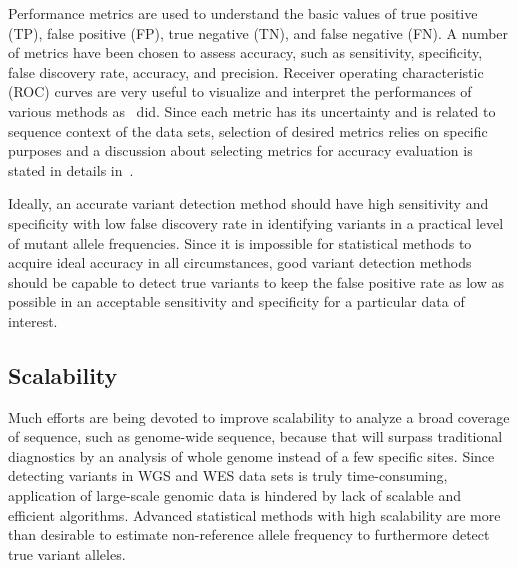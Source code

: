 \documentclass[a4,center,fleqn]{NAR}
\begin{document}
Performance metrics are used to understand the basic values of true positive (TP), false positive (FP), true negative (TN), and false negative (FN).
A number of metrics have been chosen to assess accuracy, such as sensitivity, specificity, false discovery rate, accuracy, and precision.
Receiver operating characteristic (ROC) curves are very useful to visualize and interpret the performances of various methods as~\citep{Xu2014, Huang2015, He2015} did.
Since each metric has its uncertainty and is related to sequence context of the data sets, selection of desired metrics relies on specific purposes and a discussion about selecting metrics for accuracy evaluation is stated in details in~\citep{Olson2015}.

Ideally, an accurate variant detection method should have high sensitivity and specificity with low false discovery rate in identifying variants in a practical level of mutant allele frequencies.
Since it is impossible for statistical methods to acquire ideal accuracy in all circumstances, good variant detection methods should be capable to detect true variants to keep the false positive rate as low as possible in an acceptable sensitivity and specificity for a particular data of interest.


\subsection{Scalability}

Much efforts are being devoted to improve scalability to analyze a broad coverage of sequence, such as genome-wide sequence, because that will surpass traditional diagnostics by an analysis of whole genome instead of a few specific sites.
Since detecting variants in WGS and WES data sets is truly time-consuming, application of large-scale genomic data is hindered by lack of scalable and efficient algorithms.
Advanced statistical methods with high scalability are more than desirable to estimate non-reference allele frequency to furthermore detect true variant alleles.
\end{document}

